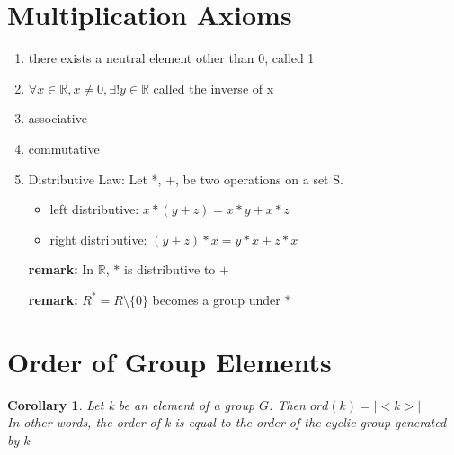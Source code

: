 \documentclass{article}
\newtheorem*{corollary}{Corollary}
\begin{document}
    \section{Multiplication Axioms}
    \begin{enumerate}
        \item there exists a neutral element other than 0, called 1
        \item \(\forall x \in \mathbb R, x \neq 0, \exists! y \in \mathbb R\) called the inverse of x
        \item associative
        \item commutative
        \item Distributive Law: 
        Let *, +, be two operations on a set S.
        \begin{itemize}
            \item left distributive: \(x*(y+z) = x*y +x*z\)
            \item right distributive: \((y+z)*x = y*x +z*x\)
        \end{itemize}
    \end{enumerate}

    \begin{itemize}
        \item[\textbf{remark:}]  In \(\mathbb R\), $*$ is distributive to $+$
        \item[\textbf{remark:}]  $R^* = R \setminus \{0\}$ becomes a group under $*$
    \end{itemize}
  
    \section{Order of Group Elements}
    \begin{corollary}
        Let k be an element of a group \(G\). Then \(ord(k)=|<k>|\)\\
        In other words, the order of k is 
        equal to the order of the cyclic group generated by \(k\)
    \end{corollary}
    
\end{document}
